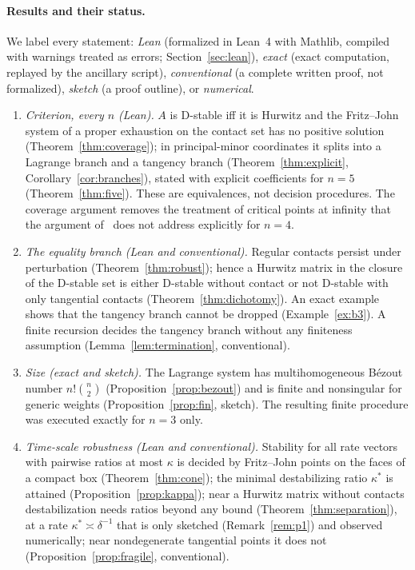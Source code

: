 \documentclass[11pt,a4paper]{article}
\theoremstyle{plain}
\theoremstyle{definition}
\newcommand{\ks}{\kappa^{*}}
\begin{document}
\paragraph{Results and their status.} We label every statement: \emph{Lean} (formalized in Lean~4 with Mathlib,
compiled with warnings treated as errors; Section~\ref{sec:lean}), \emph{exact} (exact computation, replayed by
the ancillary script), \emph{conventional} (a complete written proof, not formalized), \emph{sketch} (a proof
outline), or \emph{numerical}.
\begin{enumerate}[label=(\roman*)]
\item \emph{Criterion, every $n$ (Lean).} $A$ is D-stable iff it is Hurwitz and the Fritz--John system of a proper
exhaustion on the contact set has no positive solution (Theorem~\ref{thm:coverage}); in principal-minor
coordinates it splits into a Lagrange branch and a tangency branch (Theorem~\ref{thm:explicit},
Corollary~\ref{cor:branches}), stated with explicit coefficients for $n=5$ (Theorem~\ref{thm:five}). These are
equivalences, not decision procedures. The coverage argument removes the treatment of critical points at
infinity that the argument of~\cite{KanoveiLogofet1998} does not address explicitly for $n=4$.
\item \emph{The equality branch (Lean and conventional).} Regular contacts persist under perturbation
(Theorem~\ref{thm:robust}); hence a Hurwitz matrix in the closure of the D-stable set is either D-stable without
contact or not D-stable with only tangential contacts (Theorem~\ref{thm:dichotomy}). An exact example shows that
the tangency branch cannot be dropped (Example~\ref{ex:b3}). A finite recursion decides the tangency branch
without any finiteness assumption (Lemma~\ref{lem:termination}, conventional).
\item \emph{Size (exact and sketch).} The Lagrange system has multihomogeneous B\'ezout number $n!\binom n2$
(Proposition~\ref{prop:bezout}) and is finite and nonsingular for generic weights (Proposition~\ref{prop:fin},
sketch). The resulting finite procedure was executed exactly for $n=3$ only.
\item \emph{Time-scale robustness (Lean and conventional).} Stability for all rate vectors with pairwise ratios at
most $\kappa$ is decided by Fritz--John points on the faces of a compact box (Theorem~\ref{thm:cone}); the
minimal destabilizing ratio $\ks$ is attained (Proposition~\ref{prop:kappa}); near a Hurwitz matrix without
contacts destabilization needs ratios beyond any bound (Theorem~\ref{thm:separation}), at a rate
$\ks\asymp\delta^{-1}$ that is only sketched (Remark~\ref{rem:p1}) and observed numerically; near nondegenerate
tangential points it does not (Proposition~\ref{prop:fragile}, conventional).
\end{enumerate}
\end{document}
